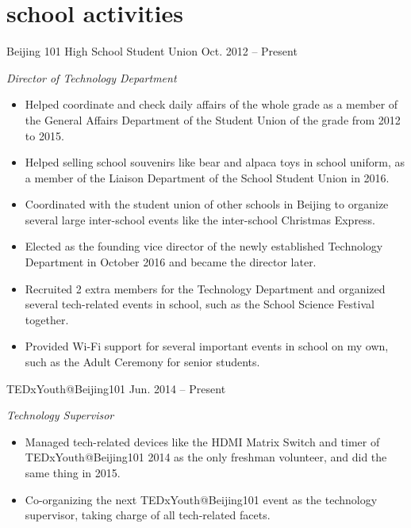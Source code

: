 \documentclass[]{adamyi-cv} %
\begin{document}

\section{school activities}

\begin{entrylist}


\entry
{Beijing 101 High School Student Union}
{Oct. 2012 -- Present}
{\emph{Director of Technology Department}
\begin{itemize}
\item Helped coordinate and check daily affairs of the whole grade as a member of the General Affairs Department of the Student Union of the grade from 2012 to 2015.
\item Helped selling school souvenirs like bear and alpaca toys in school uniform, as a member of the Liaison Department of the School Student Union in 2016.
\item Coordinated with the student union of other schools in Beijing to organize several large inter-school events like the inter-school Christmas Express.
\item Elected as the founding vice director of the newly established Technology Department in October 2016 and became the director later.
\item Recruited 2 extra members for the Technology Department and organized several tech-related events in school, such as the School Science Festival together.
\item Provided Wi-Fi support for several important events in school on my own, such as the Adult Ceremony for senior students.
\end{itemize}}


\entry
{TEDxYouth@Beijing101}
{Jun. 2014 -- Present}
{\emph{Technology Supervisor}
\begin{itemize}
\item Managed tech-related devices like the HDMI Matrix Switch and timer of TEDxYouth@Beijing101 2014 as the only freshman volunteer, and did the same thing in 2015.
\item Co-organizing the next TEDxYouth@Beijing101 event as the technology supervisor, taking charge of all tech-related facets.
\end{itemize}}


\end{entrylist}
\end{document}
